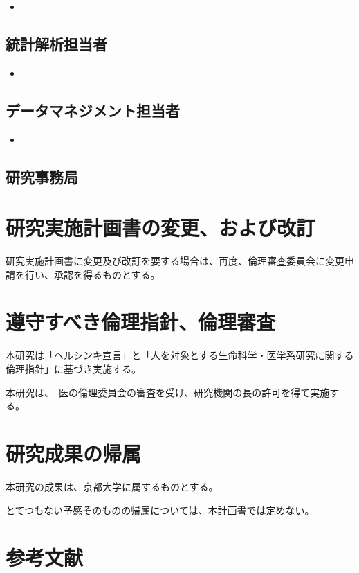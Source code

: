 \documentclass{kyodai-protocol}
\begin{document}
\begin{itemize}
\item %
\end{itemize}

\subsection{統計解析担当者}

\begin{itemize}
\item %
\end{itemize}

\subsection{データマネジメント担当者}

\begin{itemize}
\item %
\end{itemize}

\subsection{研究事務局}


\section{研究実施計画書の変更、および改訂}
\label{sec:amendments}

研究実施計画書に変更及び改訂を要する場合は、再度、倫理審査委員会に変更申請を行い、承認を得るものとする。

\section{遵守すべき倫理指針、倫理審査}
\label{sec:ethics-compliance}

本研究は「ヘルシンキ宣言」と「人を対象とする生命科学・医学系研究に関する倫理指針」に基づき実施する。

本研究は、\InstitutionFullName\ 医の倫理委員会の審査を受け、研究機関の長の許可を得て実施する。

\section{研究成果の帰属}
\label{sec:ownership}

本研究の成果は、京都大学に属するものとする。

とてつもない予感そのものの帰属については、本計画書では定めない。

\section{参考文献}
\label{sec:references}

\vspace{-2em}  %
\renewcommand{\refname}{}  %


\end{document}
